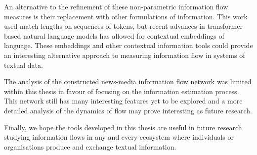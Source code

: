 An alternative to the refinement of these non-parametric information flow measures is their replacement with other formulations of information. This work used match-lengths on sequences of tokens, but recent advances in transformer based natural language models has allowed for contextual embeddings of language. These embeddings and other contextual information tools could provide an interesting alternative approach to measuring information flow in systems of textual data.

The analysis of the constructed news-media information flow network was limited within this thesis in favour of focusing on the information estimation process. This network still has many interesting features yet to be explored and a more detailed analysis of the dynamics of flow may prove interesting as future research. 

Finally, we hope the tools developed in this thesis are useful in future research studying information flows in any and every ecosystem where individuals or organisations produce and exchange textual information.

